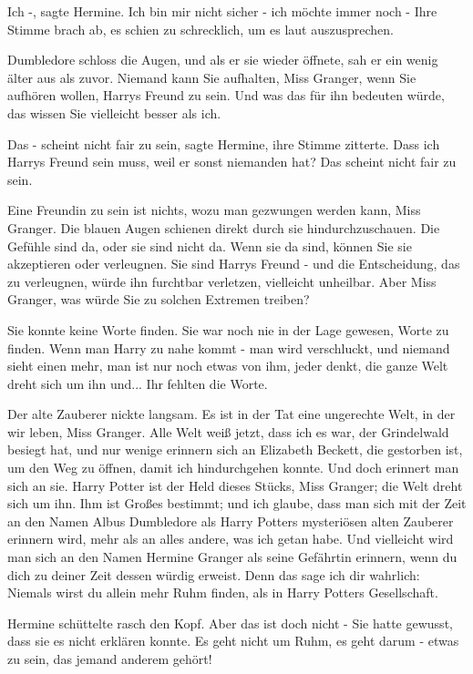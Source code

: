\glqq Ich -\grqq{}, sagte Hermine. \glqq Ich bin mir nicht sicher - ich möchte
immer noch -\grqq{} Ihre Stimme brach ab, es schien zu schrecklich, um es laut
auszusprechen.

Dumbledore schloss die Augen, und als er sie wieder öffnete, sah er ein wenig
älter aus als zuvor. \glqq Niemand kann Sie aufhalten, Miss Granger, wenn Sie
aufhören wollen, Harrys Freund zu sein. Und was das für ihn bedeuten würde, das
wissen Sie vielleicht besser als ich.\grqq{}

\glqq Das - scheint nicht fair zu sein\grqq{}, sagte Hermine, ihre Stimme
zitterte. \glqq Dass ich Harrys Freund sein muss, weil er sonst niemanden hat?
Das scheint nicht fair zu sein.\grqq{}

\glqq Eine Freundin zu sein ist nichts, wozu man gezwungen werden kann, Miss
Granger.\grqq{} Die blauen Augen schienen direkt durch sie hindurchzuschauen.
\glqq Die Gefühle sind da, oder sie sind nicht da. Wenn sie da sind, können Sie
sie akzeptieren oder verleugnen. Sie sind Harrys Freund - und die Entscheidung,
das zu verleugnen, würde ihn furchtbar verletzen, vielleicht unheilbar. Aber
Miss Granger, was würde Sie zu solchen Extremen treiben?\grqq{}

Sie konnte keine Worte finden. Sie war noch nie in der Lage gewesen, Worte zu
finden. \glqq Wenn man Harry zu nahe kommt - man wird verschluckt, und niemand
sieht einen mehr, man ist nur noch etwas von ihm, jeder denkt, die ganze Welt
dreht sich um ihn und...\grqq{} Ihr fehlten die Worte.

Der alte Zauberer nickte langsam. \glqq Es ist in der Tat eine ungerechte Welt,
in der wir leben, Miss Granger. Alle Welt weiß jetzt, dass ich es war, der
Grindelwald besiegt hat, und nur wenige erinnern sich an Elizabeth Beckett, die
gestorben ist, um den Weg zu öffnen, damit ich hindurchgehen konnte. Und doch
erinnert man sich an sie. Harry Potter ist der Held dieses Stücks, Miss Granger;
die Welt dreht sich um ihn. Ihm ist Großes bestimmt; und ich glaube, dass man
sich mit der Zeit an den Namen Albus Dumbledore als Harry Potters mysteriösen
alten Zauberer erinnern wird, mehr als an alles andere, was ich getan habe. Und
vielleicht wird man sich an den Namen Hermine Granger als seine Gefährtin
erinnern, wenn du dich zu deiner Zeit dessen würdig erweist. Denn das sage ich
dir wahrlich: Niemals wirst du allein mehr Ruhm finden, als in Harry Potters
Gesellschaft.\grqq{}

Hermine schüttelte rasch den Kopf. \glqq Aber das ist doch nicht -\grqq{} Sie
hatte gewusst, dass sie es nicht erklären konnte. \glqq Es geht nicht um Ruhm,
es geht darum - etwas zu sein, das jemand anderem gehört!\grqq{}

